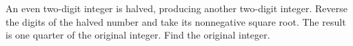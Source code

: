 An even two-digit integer is halved, producing another two-digit integer. Reverse the digits of the halved number and take its nonnegative square root. The result is one quarter of the original integer. Find the original integer.
